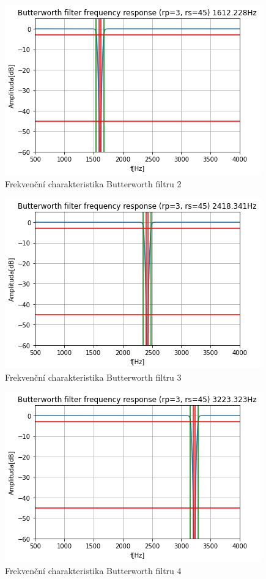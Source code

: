 \documentclass{article}
\begin{document}
\begin{figure}[H] 
	\centering
	\includegraphics[scale=0.65,keepaspectratio]{Figure_15}
	\caption{Frekvenční charakteristika Butterworth filtru 2}
\end{figure}

\begin{figure}[H] 
	\centering
	\includegraphics[scale=0.65,keepaspectratio]{Figure_16}
	\caption{Frekvenční charakteristika Butterworth filtru 3}
\end{figure}

\begin{figure}[H] 
	\centering
	\includegraphics[scale=0.65,keepaspectratio]{Figure_17}
	\caption{Frekvenční charakteristika Butterworth filtru 4}
\end{figure}
\end{document}
